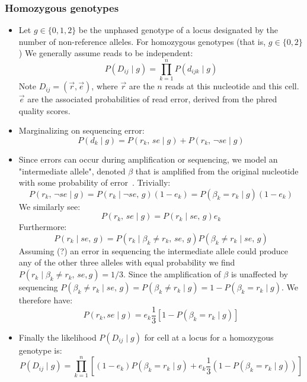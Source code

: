 \documentclass[../main.tex]{subfiles}
\begin{document}
\subsubsection*{Homozygous genotypes}
\begin{itemize}
    \item Let $g\in\{0,1,2\}$ be the unphased genotype of a locus designated by the number of non-reference alleles. For homozygous genotypes (that is, $g\in\{0,2\}$) We generally assume reads to be independent:
    \begin{equation}
        P(D_{ij}\mid g) = \prod_{k=1}^n P(d_{ijk} \mid g)
    \end{equation}
    Note $D_{ij}=(\vec{r},\vec{e})$, where $\vec{r}$ are the $n$ reads at this nucleotide and this cell. $\vec{e}$ are the associated probabilities of read error, derived from the phred quality scores.\\
    \item Marginalizing on sequencing error:
    \begin{equation*}
        P(d_k \mid g) =  P(r_k,\,se \mid g) + P(r_k,\,\neg se \mid g)
    \end{equation*}
    \item Since errors can occur during amplification or sequencing, we model an "intermediate allele", denoted $\beta$ that is amplified from the original nucleotide with some probability of error~\cite{monovar}. Trivially:
    \begin{equation*}
        P(r_k,\,\neg se \mid g) = P(r_k\mid \neg se ,\, g)(1-e_k)=P(\beta_k=r_k\mid g)(1-e_k) 
    \end{equation*}
    We similarly see:
    \begin{equation*}
        P(r_k,\, se \mid g) = P(r_k\mid se,\, g)e_k
    \end{equation*}
    Furthermore:
    \begin{equation*}
        P(r_k\mid se,\, g) = P(r_k\mid \beta_k\neq r_k,\,se,\,g) P(\beta_k\neq r_k \mid se,\,g)
    \end{equation*}
     Assuming (?) an error in sequencing the intermediate allele could produce any of the other three alleles with equal probability we find $P(r_k\mid \beta_k \neq r_k,\,se,g)=1/3$. Since the amplification of $\beta$ is unaffected by sequencing $P(\beta_k\neq r_k \mid se,\,g)=P(\beta_k\neq r_k\mid g)=1-P(\beta_k=r_k\mid g)$. We therefore have:
     \begin{equation*}
         P(r_k, se \mid g) = e_k \frac{1}{3}\left[1-P(\beta_k=r_k\mid g)\right]
     \end{equation*}
     \item Finally the likelihood $P(D_{ij}\mid g)$ for cell at a locus for a homozygous genotype is:
     \begin{equation}
          P(D_{ij}\mid g) = \prod_{k=1}^n \left[ (1-e_k)P(\beta_k=r_k\mid g) + e_k \frac{1}{3} (1-P(\beta_k=r_k\mid g)) \right]
     \end{equation}
\end{itemize}
\end{document}
